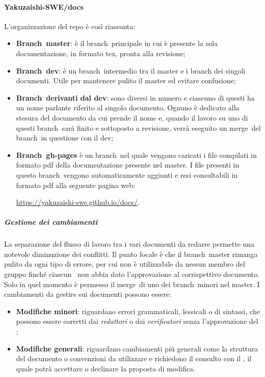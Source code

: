         \paragraph{Yakuzaishi-SWE/docs}
        L'organizzazione del repo è così riassunta:
        \begin{itemize}
            \item \textbf{Branch\glo\ master}: è il branch\glo\ principale in cui è presente la sola documentazione, in formato tex, pronta alla revisione;
            \item \textbf{Branch\glo\ dev}: è un branch\glo\ intermedio tra il master e i branch dei singoli documenti. Utile per mantenere pulito il master ed evitare confusione;
            \item \textbf{Branch\glo\ derivanti dal dev}: sono diversi in numero e ciascuno di questi ha un nome parlante riferito al singolo documento. Ognuno è dedicato alla stesura del documento da cui prende il nome e, quando il lavoro su uno di questi branch\glo\ sarà finito e sottoposto a revisione, verrà eseguito un merge\glo\ del branch\glo\ in questione con il dev;
            \item \textbf{Branch\glo\ gh-pages} è un branch\glo\ nel quale vengono caricati i file compilati in formato pdf della documentazione presente nel master. I file presenti in questo branch\glo\ vengono automaticamente aggiunti e resi consultabili in formato pdf alla seguente pagina web:
            \begin{center}
                \url{https://yakuzaishi-swe.github.io/docs/}.
            \end{center}
        \end{itemize}

            \subparagraph{Gestione dei cambiamenti}
            La separazione del flusso di lavoro tra i vari documenti da redarre permette una notevole diminuzione dei conflitti. Il punto focale è che il branch\glo\ master rimanga pulito da ogni tipo di errore, per cui non è utilizzabile da nessun membro del gruppo finché ciascun \roleProjectManagerLow\ non abbia dato l’approvazione al corrispettivo documento. Solo in quel momento è permesso il merge\glo\ di uno dei branch\glo\ minori nel master. I cambiamenti da gestire sui documenti possono essere:
            \begin{itemize}
                \item \textbf{Modifiche minori}: riguardano errori grammaticali, lessicali o di sintassi, che possono essere corretti dai \textit{redattori} o dai \textit{verificatori} senza l’approvazione del \roleProjectManagerLow;
                \item \textbf{Modifiche generali}: riguardano cambiamenti più generali come la struttura del documento o convenzioni da utilizzare e richiedono il consulto con il \roleProjectManagerLow, il quale potrà accettare o declinare la proposta di modifica.
            \end{itemize}

